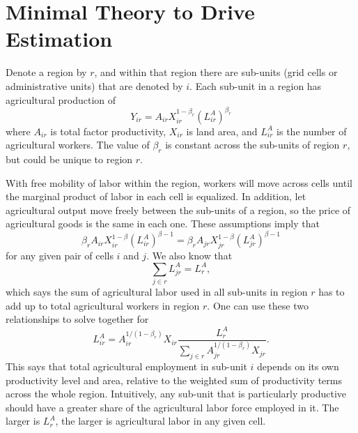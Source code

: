 \documentclass[10pt]{article}
\begin{document}
\onehalfspacing 

\section{Minimal Theory to Drive Estimation}
Denote a region by $r$, and within that region there are sub-units (grid cells or administrative units) that are denoted by $i$. Each sub-unit in a region has agricultural production of
\begin{equation}
Y_{ir} = A_{ir} X_{ir}^{1-\beta_r} (L^A_{ir})^{\beta_r}
\end{equation}
where $A_{ir}$ is total factor productivity, $X_{ir}$ is land area, and $L^A_{ir}$ is the number of agricultural workers. The value of $\beta_r$ is constant across the sub-units of region $r$, but could be unique to region $r$.

With free mobility of labor within the region, workers will move across cells until the marginal product of labor in each cell is equalized. In addition, let agricultural output move freely between the sub-units of a region, so the price of agricultural goods is the same in each one. These assumptions imply that
\begin{equation}
\beta_r A_{ir} X_{ir}^{1-\beta} (L^A_{ir})^{\beta-1} = \beta_r A_{jr} X_{jr}^{1-\beta} (L^A_{jr})^{\beta-1}
\end{equation}
for any given pair of cells $i$ and $j$. We also know that
\begin{equation}
\sum_{j\in r} L^A_{jr} = L^A_{r},
\end{equation}
which says the sum of agricultural labor used in all sub-units in region $r$ has to add up to total agricultural workers in region $r$. One can use these two relationships to solve together for
\begin{equation}
L^A_{ir} = A_{ir}^{1/(1-\beta_r)}X_{ir} \frac{L^A_{r}}{\sum_{j\in r} A_{jr}^{1/(1-\beta_r)}X_{jr}}.
\end{equation}
This says that total agricultural employment in sub-unit $i$ depends on its own productivity level and area, relative to the weighted sum of productivity terms across the whole region. Intuitively, any sub-unit that is particularly productive should have a greater share of the agricultural labor force employed in it. The larger is $L^A_{r}$, the larger is agricultural labor in any given cell.
\end{document}
